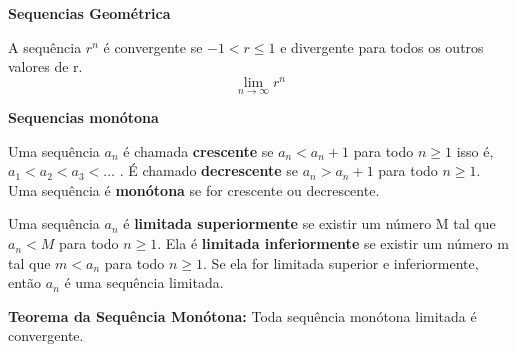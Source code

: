 \documentclass[12pt]{article}
\begin{document}
\begin{itemize}
    \subitem \large \textbf{Sequencias Geométrica}

    A sequência $r^n$ é convergente se $ -1 < r \leq 1$ e divergente para todos os outros valores de r.
    \begin{equation}
        \lim_{n\to\infty} r^n
    \end{equation}

    \subitem \large \textbf{Sequencias monótona}

    Uma sequência $a_n$ é chamada \textbf{crescente} se $a_n < a_n+1$ para todo $n \geq 1$ isso é,$a_1 < a_2 < a_3 < \dots$ . É chamado \textbf{decrescente} se $a_n > a_n+1$ para todo $n \geq 1$. Uma sequência é \textbf{monótona} se for crescente ou decrescente.

    Uma sequência $a_n$ é \textbf{limitada superiormente} se existir um número M tal que $a_n < M$ para todo $n \geq 1$. Ela é \textbf{limitada inferiormente} se existir um número m tal que $m < a_n$ para todo $n \geq 1$. Se ela for limitada superior e inferiormente, então $a_n$ é uma sequência limitada.

    \textbf{Teorema da Sequência Monótona:} Toda sequência monótona limitada é convergente.
  
  \end{itemize}
  
\end{document}
